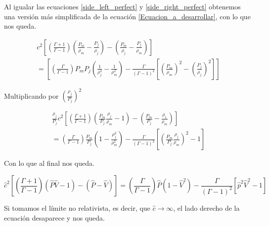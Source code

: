 \documentclass[12pt,a4paper]{book}
\begin{document}
Al igualar las ecuaciones \ref{side_left_perfect} y \ref{side_right_perfect} obtenemos una versión más simplificada de la ecuación \ref{Ecuacion_a_desarrollar}, con lo que nos queda.

\begin{eqnarray} \label{Ecuacion_simplificada}
c ^ { 2 } \left[ \left( \frac { \Gamma + 1 } { \Gamma - 1 } \right) \left( \frac { P _ { m } } { \rho _ { m } } - \frac { P _ { j } } { \rho _ { j } } \right) - \left( \frac { P _ { m } } { \rho _ { j } } - \frac { P _ { j } } { \rho _ { m } } \right) \right]
\nonumber \\ 
= \left[ \left( \frac { \Gamma } { \Gamma - 1 } \right) P _ { m } P _ { j } \left( \frac { 1 } { \rho _ { j } ^ { 2 } } - \frac { 1 } { \rho _ { m } ^ { 2 } } \right) - \frac { \Gamma } { ( \Gamma - 1 ) ^ { 2 } } \left[ \left( \frac { P _ { m } } { \rho _ { m } } \right) ^ { 2 } - \left( \frac { P _ { j } } { \rho _ { j } } \right) ^ { 2 } \right] \right]
\end{eqnarray}

Multiplicando por $\left( \frac{\rho_j}{P_j}\right)^2$

\begin{eqnarray}
\frac { \rho _ { j } } { P _ { j } } c ^ { 2 } \left[ \left( \frac { \Gamma + 1 } { \Gamma - 1 } \right) \left( \frac { P _ { m } } { P _ { j } } \frac { \rho _ { j } } { \rho _ { m } } - 1 \right) - \left( \frac { P _ { m } } { P _ { j } } - \frac { \rho _ { 1 } } { \rho _ { m } } \right) \right] \nonumber \\
=\left( \frac { \Gamma } { \Gamma - 1 } \right) \frac { P _ { m } } { P _ { j } } \left( 1 - \frac { \rho _ { j } ^ { 2 } } { \rho _ { m } ^ { 2 } } \right) - \frac { \Gamma } { ( \Gamma - 1 ) ^ { 2 } } \left[ \left( \frac { P _ { m } } { P _ { j } } \frac { \rho _ { j } } { \rho _ { m } } \right) ^ { 2 } - 1 \right]
\end{eqnarray}

Con lo que al final nos queda.

\begin{equation} \label{ecuacion_RH}
\hat { c } ^ { 2 } \left[ \left( \frac { \Gamma + 1 } { \Gamma - 1 } \right) ( \hat { P } \hat { V } - 1 ) - ( \hat { P } - \hat { V } ) \right] =
\left( \frac { \Gamma } { \Gamma - 1 } \right) \hat { P } \left( 1 - \hat { V } ^ { 2 } \right) - \frac { \Gamma } { ( \Gamma - 1 ) ^ { 2 } } \left[ \hat { p } ^ { 2 } \hat { V } ^ { 2 } - 1 \right]
\end{equation}

Si tomamos el límite no relativista, es decir, que $\hat{c} \longrightarrow \infty$, el lado derecho de la ecuación desaparece y nos queda.
\end{document}
